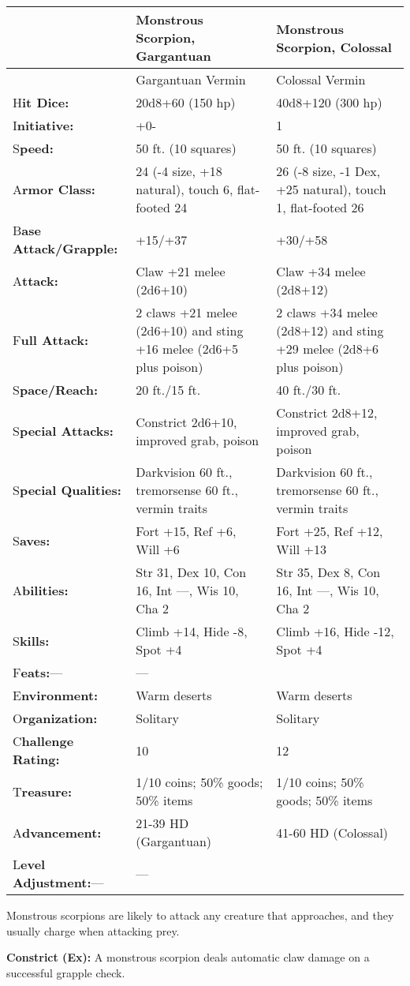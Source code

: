 \documentclass{article}
\begin{document}
\vspace{12pt}
\begin{tabular}{|>{\raggedright}p{56pt}|>{\raggedright}p{129pt}|>{\raggedright}p{128pt}|}
\hline
  & M\textbf{onstrous Scorpion, Gargantuan} & M\textbf{onstrous Scorpion, Colossal}\tabularnewline
\hline
  & Gargantuan Vermin & Colossal Vermin\tabularnewline
\hline
H\textbf{it Dice:} & 20d8+60 (150 hp) & 40d8+120 (300 hp)\tabularnewline
\hline
I\textbf{nitiative:} & +0- & 1\tabularnewline
\hline
S\textbf{peed:} & 50 ft. (10 squares) & 50 ft. (10 squares)\tabularnewline
\hline
A\textbf{rmor Class:} & 24 (-4 size, +18 natural), touch 6, flat-footed 24 & 26 
(-8 size, -1 Dex, +25 natural), touch 1, flat-footed 26\tabularnewline
\hline
B\textbf{ase Attack/Grapple:} & +15/+37 & +30/+58\tabularnewline
\hline
A\textbf{ttack:} & Claw +21 melee (2d6+10) & Claw +34 melee (2d8+12)\tabularnewline
\hline
F\textbf{ull Attack:} & 2 claws +21 melee (2d6+10) and sting +16 melee (2d6+5 plus 
poison) & 2 claws +34 melee (2d8+12) and sting +29 melee (2d8+6 plus poison)\tabularnewline
\hline
S\textbf{pace/Reach:} & 20 ft./15 ft. & 40 ft./30 ft.\tabularnewline
\hline
S\textbf{pecial Attacks:} & Constrict 2d6+10, improved grab, poison & Constrict 
2d8+12, improved grab, poison\tabularnewline
\hline
S\textbf{pecial Qualities:} & Darkvision 60 ft., tremorsense 60 ft., vermin traits & Darkvision 
60 ft., tremorsense 60 ft., vermin traits\tabularnewline
\hline
S\textbf{aves:} & Fort +15, Ref +6, Will +6 & Fort +25, Ref +12, Will +13\tabularnewline
\hline
A\textbf{bilities:} & Str 31, Dex 10, Con 16, Int ---, Wis 10, Cha 2 & Str 35, 
Dex 8, Con 16, Int ---, Wis 10, Cha 2\tabularnewline
\hline
S\textbf{kills:} & Climb +14, Hide -8, Spot +4 & Climb +16, Hide -12, Spot +4\tabularnewline
\hline
F\textbf{eats:}--- & --- & \tabularnewline
\hline
E\textbf{nvironment:} & Warm deserts & Warm deserts\tabularnewline
\hline
O\textbf{rganization:} & Solitary & Solitary\tabularnewline
\hline
C\textbf{hallenge Rating:} & 10 & 12\tabularnewline
\hline
T\textbf{reasure:} & 1/10 coins; 50\% goods; 50\% items & 1/10 coins; 50\% goods; 
50\% items\tabularnewline
\hline
A\textbf{dvancement:} & 21-39 HD (Gargantuan) & 41-60 HD (Colossal)\tabularnewline
\hline
L\textbf{evel Adjustment:}--- & --- & \tabularnewline
\hline
\end{tabular}

Monstrous scorpions are likely to attack any creature that approaches, and they 
usually charge when attacking prey.

\textbf{Constrict (Ex): }A monstrous scorpion deals automatic claw damage on a 
successful grapple check.
\end{document}
